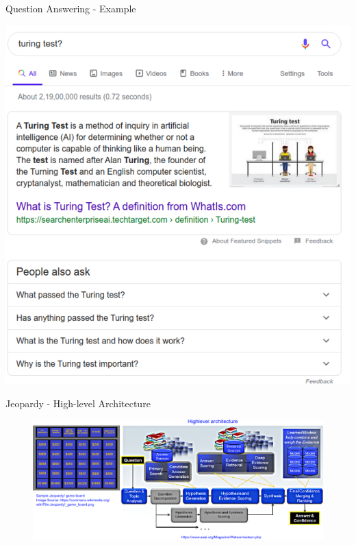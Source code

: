 \begin{frame}{Question Answering - Example}
\begin{center}
	\includegraphics[width=0.55\linewidth]{"./Images/GoogleSnipetResult"}
\end{center}

\end{frame}

\begin{frame}{Jeopardy - High-level Architecture}
\begin{figure}
	\centering
	\includegraphics[width=1.0\linewidth]{./Images/Jeopardy_game_board}
	\label{fig:jeopardygameboard}
\end{figure}

\end{frame}

